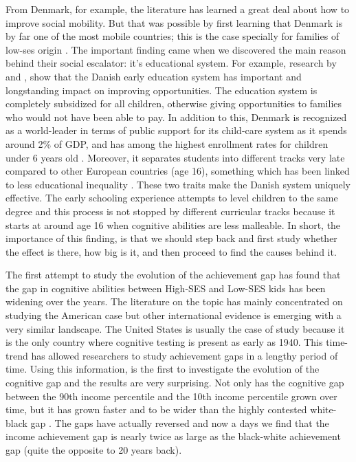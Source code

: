 \documentclass[11pt, a4paper]{article}\usepackage[]{graphicx}\usepackage[]{color}
\begin{document}
From Denmark, for example, the literature has learned a great deal about how to improve social mobility. But that was possible by first learning that Denmark is by far one of the most mobile countries; this is the case specially for families of low-ses origin \citep{bjorklund2009, jaeger2007}. The important finding came when we discovered the main reason behind their social escalator: it's educational system. For example, research by \citet{esping_waldfogel2012} and \citet{bauchmuller2014}, show that the Danish early education system has important and longstanding impact on improving opportunities. The education system is completely subsidized for all children, otherwise giving opportunities to families who would not have been able to pay. In addition to this, Denmark is recognized as a world-leader in terms of public support for its child-care system as it spends around 2\% of GDP, and has among the highest enrollment rates for children under 6 years old \citep{esping_waldfogel2012}. Moreover, it separates students into different tracks very late compared to other European countries (age 16), something which has been linked to less educational inequality \citep{hanushek_woesmann_tracking}. These two traits make the Danish system uniquely effective. The early schooling experience attempts to level children to the same degree and this process is not stopped by different curricular tracks because it starts at around age 16 when cognitive abilities are less malleable. In short, the importance of this finding, is that we should step back and first study whether the effect is there, how big is it, and then proceed to find the causes behind it.

The first attempt to study the evolution of the achievement gap has found that the gap in cognitive abilities between High-SES and Low-SES kids has been widening over the years. The literature on the topic has mainly concentrated on studying the American case \citep{reardon2011} but other international evidence is emerging with a very similar landscape. The United States is usually the case of study because it is the only country where cognitive testing is present as early as 1940. This time-trend has allowed researchers to study achievement gaps in a lengthy period of time. Using this information, \citet{reardon2011} is the first to investigate the evolution of the cognitive gap and the results are very surprising. Not only has the cognitive gap between the 90th income percentile and the 10th income percentile grown over time, but it has grown faster and to be wider than the highly contested white-black gap \citep{magnuson2008}. The gaps have actually reversed and now a days we find that the income achievement gap is nearly twice as large as the black-white achievement gap (quite the opposite to 20 years back).
\end{document}
